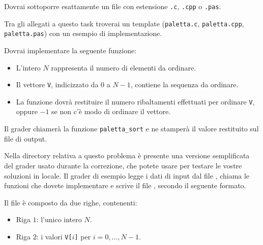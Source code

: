 \Implementation


Dovrai sottoporre esattamente un file con estensione \texttt{.c}, \texttt{.cpp} o \texttt{.pas}.

\begin{warning}
Tra gli allegati a questo task troverai un template (\texttt{paletta.c}, \texttt{paletta.cpp}, \texttt{paletta.pas}) con un esempio di implementazione.
\end{warning}

Dovrai implementare la seguente funzione:

\begin{itemize}[nolistsep]

	\begin{itemize}[nolistsep]
	  \item L'intero $N$ rappresenta il numero di elementi da ordinare.
	  \item Il vettore \texttt{V}, indicizzato da $0$ a $N-1$, contiene la sequenza da ordinare.
	  \item La funzione dovrà restituire il numero ribaltamenti effettuati per ordinare \texttt{V}, oppure $-1$ se non c'è modo di ordinare il vettore.
	\end{itemize}
\end{itemize}

\medskip

Il grader chiamerà la funzione \texttt{paletta\_sort} e ne stamperà il valore restituito sul file di output.



\Grader
Nella directory relativa a questo problema è presente una versione semplificata del grader usato durante la correzione, che potete usare per testare le vostre soluzioni in locale. Il grader di esempio legge i dati di input dal file , chiama le funzioni che dovete implementare e scrive il file \outputfile{}, secondo il seguente formato.

Il file  è composto da due righe, contenenti:
\begin{itemize}[nolistsep,itemsep=2mm]
\item Riga $1$: l'unico intero $N$.
\item Riga $2$: i valori \texttt{V[$i$]} per $i = 0,\ldots, N-1$.
\end{itemize}

